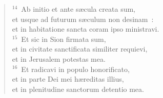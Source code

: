 \begin{flushleft}\begin{verse}${}^{14}$~Ab initio et ante s\ae cula creata sum,\\ et usque ad futurum s\ae culum non desinam~:\\ et in habitatione sancta coram ipso ministravi.\\
${}^{15}$~Et sic in Sion firmata sum,\\ et in civitate sanctificata similiter requievi,\\ et in Jerusalem potestas mea.\\
${}^{16}$~Et radicavi in populo honorificato,\\ et in parte Dei mei h\ae reditas illius,\\ et in plenitudine sanctorum detentio mea.\end{verse}\end{flushleft}


